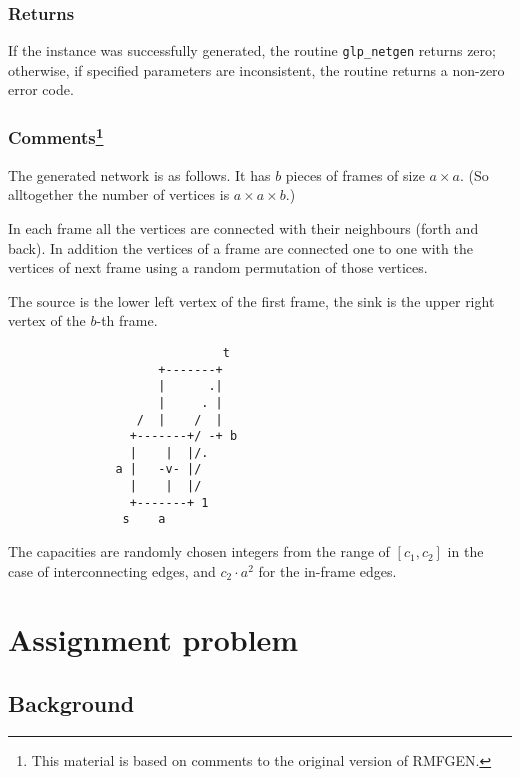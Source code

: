 \documentclass[dvipdfm,11pt]{report}
\begin{document}
\subsubsection*{Returns}

If the instance was successfully generated, the routine
\verb|glp_netgen| returns zero; otherwise, if specified parameters are
inconsistent, the routine returns a non-zero error code.

\newpage

\subsubsection*{Comments\footnote{This material is based on comments
to the original version of RMFGEN.}}

The generated network is as follows. It has $b$ pieces of frames of
size $a\times a$. (So alltogether the number of vertices is
$a\times a\times b$.)

In each frame all the vertices are connected with their neighbours
(forth and back). In addition the vertices of a frame are connected
one to one with the vertices of next frame using a random permutation
of those vertices.

The source is the lower left vertex of the first frame, the sink is
the upper right vertex of the $b$-th frame.

\begin{verbatim}
                              t
                     +-------+
                     |      .|
                     |     . |
                  /  |    /  |
                 +-------+/ -+ b
                 |    |  |/.
               a |   -v- |/
                 |    |  |/
                 +-------+ 1
                s    a
\end{verbatim}

The capacities are randomly chosen integers from the range of
$[c_1,c_2]$  in the case of interconnecting edges, and $c_2\cdot a^2$
for the in-frame edges.


\newpage

\section{Assignment problem}

\subsection{Background}
\end{document}
